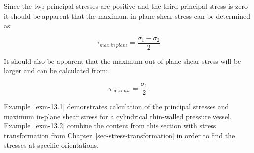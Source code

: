 \documentclass[
  letterpaper,
  DIV=11,
  numbers=noendperiod]{scrreprt}
\theoremstyle{definition}
\theoremstyle{remark}
\begin{document}
Since the two principal stresses are positive and the third principal
stress is zero it should be apparent that the maximum in plane shear
stress can be determined as:

\[
\tau_{max~in~plane}=\frac{\sigma_1-\sigma_2}{2}
\]

It should also be apparent that the maximum out-of-plane shear stress
will be larger and can be calculated from:

\[
\tau_{\max a b s}=\frac{\sigma_1}{2}
\]

Example~\ref{exm-13.1} demonstrates calculation of the principal
stresses and maximum in-plane shear stress for a cylindrical thin-walled
pressure vessel. Example~\ref{exm-13.2} combine the content from this
section with stress transformation from
Chapter~\ref{sec-stress-transformation} in order to find the stresses at
specific orientations.
\end{document}

